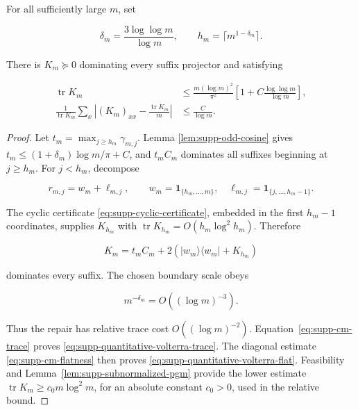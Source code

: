 \begin{proposition}
\label{prop:supp-quantitative-volterra}
For all sufficiently large \(m\), set

\begin{equation}\label{eq:supp-moving-boundary}
 \delta_m=\frac{3\log\log m}{\log m},
 \qquad h_m=\lceil m^{1-\delta_m}\rceil.
\end{equation}

There is \(K_m\succeq0\) dominating every suffix projector and satisfying

\begin{align}
 \operatorname{tr}K_m
 &\le\frac{m(\log m)^2}{\pi^2}
 \left[1+C\frac{\log\log m}{\log m}\right],
 \label{eq:supp-quantitative-volterra-trace}\\
 \frac1{\operatorname{tr}K_m}\sum_x
 \left|(K_m)_{xx}-\frac{\operatorname{tr}K_m}{m}\right|
 &\le\frac C{\log m}.
 \label{eq:supp-quantitative-volterra-flat}
\end{align}
\end{proposition}

\begin{proof}
Let \(t_m=\max_{j\ge h_m}\gamma_{m,j}\).  Lemma
\ref{lem:supp-odd-cosine} gives
\(t_m\le(1+\delta_m)\log m/\pi+C\), and
\(t_mC_m\) dominates all suffixes beginning at \(j\ge h_m\).
For \(j<h_m\), decompose

\[
 r_{m,j}=w_m+\ell_{m,j},
 \qquad
 w_m=\mathbf1_{\{h_m,\ldots,m\}},
 \quad
 \ell_{m,j}=\mathbf1_{\{j,\ldots,h_m-1\}}.
\]

The cyclic certificate \eqref{eq:supp-cyclic-certificate}, embedded in the
first \(h_m-1\) coordinates, supplies \(K_{h_m}\) with
\(\operatorname{tr}K_{h_m}=O(h_m\log^2h_m)\).  Therefore

\begin{equation}\label{eq:supp-volterra-construction}
 K_m=t_mC_m+2\left(|w_m\rangle\langle w_m|+K_{h_m}\right)
\end{equation}

dominates every suffix.  The chosen boundary scale obeys

\[
 m^{-\delta_m}=O((\log m)^{-3}).
\]

Thus the repair has relative trace cost \(O((\log m)^{-2})\).
Equation~\eqref{eq:supp-cm-trace} proves
\eqref{eq:supp-quantitative-volterra-trace}.  The diagonal estimate
\eqref{eq:supp-cm-flatness} then proves
\eqref{eq:supp-quantitative-volterra-flat}.  Feasibility and
Lemma~\ref{lem:supp-subnormalized-pgm} provide the lower estimate
\(\operatorname{tr}K_m\ge c_0m\log^2m\), for an absolute constant
\(c_0>0\), used in the relative bound.
\end{proof}

